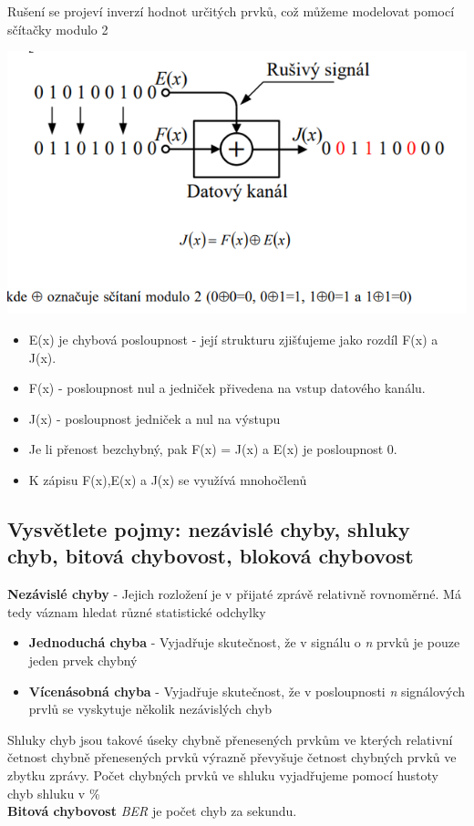 Rušení se projeví inverzí hodnot určitých prvků, což můžeme modelovat pomocí sčítačky modulo 2

\includegraphics[]{images/ručení.png}
\begin{itemize}
    \item E(x) je chybová posloupnost - její strukturu zjišťujeme jako rozdíl F(x) a J(x).
    \item F(x) - posloupnost nul a jedniček přivedena na vstup datového kanálu.
    \item J(x) - posloupnost jedniček a nul na výstupu
    \item Je li přenost bezchybný, pak F(x) = J(x) a E(x) je posloupnost 0.
    \item K zápisu F(x),E(x) a J(x) se využívá mnohočlenů
\end{itemize}
\subsection{Vysvětlete pojmy: nezávislé chyby, shluky chyb, bitová chybovost, bloková chybovost}
\textbf{Nezávislé chyby} - Jejich rozložení je v přijaté zprávě relativně rovnoměrné.
Má tedy váznam hledat různé statistické odchylky
\begin{itemize}
    \item \textbf{Jednoduchá chyba} - Vyjadřuje skutečnost, že v signálu o \emph{n} prvků je pouze jeden prvek chybný
    \item \textbf{Vícenásobná chyba} - Vyjadřuje skutečnost, že v posloupnosti \emph{n} signálových prvlů se vyskytuje několik nezávislých chyb
\end{itemize}

Shluky chyb jsou takové úseky chybně přenesených prvkům ve kterých relativní četnost chybně přenesených prvků výrazně převyšuje četnost chybných prvků ve zbytku zprávy.
Počet chybných prvků ve shluku vyjadřujeme pomocí hustoty chyb shluku v \%\\
\textbf{Bitová chybovost} \textit{BER} je počet chyb za sekundu.

